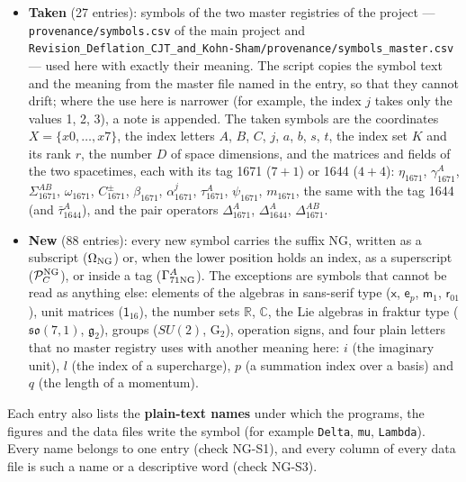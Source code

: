 \documentclass[
  10pt,
]{article}
\providecommand{\tightlist}{%
  \setlength{\itemsep}{0pt}\setlength{\parskip}{0pt}}
\begin{document}
\begin{itemize}
\tightlist
\item
  \textbf{Taken} (27 entries): symbols of the two master registries of
  the project --- \texttt{provenance/symbols.csv} of the main project
  and
  \texttt{Revision\_Deflation\_CJT\_and\_Kohn-Sham/provenance/symbols\_master.csv}
  --- used here with exactly their meaning. The script copies the symbol
  text and the meaning from the master file named in the entry, so that
  they cannot drift; where the use here is narrower (for example, the
  index \(j\) takes only the values 1, 2, 3), a note is appended. The
  taken symbols are the coordinates \(X=\{x0,\dots,x7\}\), the index
  letters \(A\), \(B\), \(C\), \(j\), \(a\), \(b\), \(s\), \(t\), the
  index set \(K\) and its rank \(r\), the number \(D\) of space
  dimensions, and the matrices and fields of the two spacetimes, each
  with its tag 1671 (\(7+1\)) or 1644 (\(4+4\)): \(\eta_{1671}\),
  \(\gamma^A_{1671}\), \(\Sigma^{AB}_{1671}\), \(\omega_{1671}\),
  \(C^\pm_{1671}\), \(\beta_{1671}\), \(\alpha^j_{1671}\),
  \(\tau^A_{1671}\), \(\psi_{1671}\), \(m_{1671}\), the same with the
  tag 1644 (and \(\bar\tau^A_{1644}\)), and the pair operators
  \(\Delta^A_{1671}\), \(\Delta^A_{1644}\), \(\Delta^{AB}_{1671}\).
\item
  \textbf{New} (88 entries): every new symbol carries the suffix NG,
  written as a subscript (\(\Omega_{\rm NG}\)) or, when the lower
  position holds an index, as a superscript (\(\mathcal P^{\rm NG}_C\)),
  or inside a tag (\(\Gamma^A_{71\rm NG}\)). The exceptions are symbols
  that cannot be read as anything else: elements of the algebras in
  sans-serif type (\(\mathsf x\), \(\mathsf e_p\), \(\mathsf m_1\),
  \(\mathsf r_{01}\)), unit matrices (\(\mathsf 1_{16}\)), the number
  sets \(\mathbb R\), \(\mathbb C\), the Lie algebras in fraktur type
  (\(\mathfrak{so}(7,1)\), \(\mathfrak g_2\)), groups (\(SU(2)\),
  \(\mathrm G_2\)), operation signs, and four plain letters that no
  master registry uses with another meaning here: \(i\) (the imaginary
  unit), \(l\) (the index of a supercharge), \(p\) (a summation index
  over a basis) and \(q\) (the length of a momentum).
\end{itemize}

Each entry also lists the \textbf{plain-text names} under which the
programs, the figures and the data files write the symbol (for example
\texttt{Delta}, \texttt{mu}, \texttt{Lambda}). Every name belongs to one
entry (check NG-S1), and every column of every data file is such a name
or a descriptive word (check NG-S3).
\end{document}
